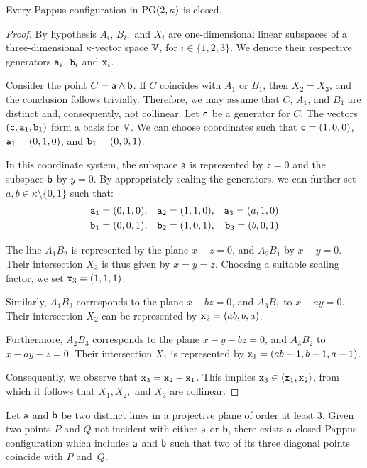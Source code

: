 \begin{thm}\label{thm:pappus} {\upshape[Pappus]}
    Every Pappus configuration in\/ $\operatorname{PG}(2,\kappa)$ is closed.
\end{thm}

\begin{proof}
    By hypothesis $A_i$, $B_i,$ and $X_i$ are one-dimensional linear subspaces of a three-dimensional $\kappa$-vector space $\mathbb V$, for $i \in \{1, 2, 3\}$. We denote their respective generators $\mathtt a_i$, $\mathtt b_i$ and $\mathtt x_i$.

    Consider the point $C = \mathsf a \wedge \mathsf b$. If $C$ coincides with $A_1$ or $B_1$, then $X_2=X_3$, and the conclusion follows trivially. Therefore, we may assume that $C$, $A_1$, and $B_1$ are distinct\/ and, consequently, not collinear. Let $\mathtt c$ be a generator for $C$. The vectors $(\mathtt c, \mathtt a_1, \mathtt b_1)$ form a basis for $\mathbb V$. We can choose coordinates such that $\mathtt c=(1,0,0)$, $\mathtt a_1=(0,1,0)$, and $\mathtt b_1=(0,0,1)$.

    In this coordinate system, the subspace $\mathsf a$ is represented by $z=0$ and the subspace $\mathsf b$ by $y=0$. By appropriately scaling the generators, we can further set $a,b \in \kappa \setminus \{0,1\}$ such that:
    \begin{align*}
        \mathtt a_1&=(0,1,0),&\mathtt a_2&=(1,1,0),&\mathtt a_3=(a,1,0)\\
        \mathtt b_1&=(0,0,1),&\mathtt b_2&=(1,0,1),&\mathtt b_3=(b,0,1)
    \end{align*}

    The line $A_1B_2$ is represented by the plane $x-z=0$, and $A_2B_1$ by $x-y=0$. Their intersection $X_3$ is thus given by $x=y=z$. Choosing a suitable scaling factor, we set $\mathtt x_3=(1,1,1)$.

    Similarly, $A_1B_3$ corresponds to the plane $x-bz=0$, and $A_3B_1$ to $x-ay=0$. Their intersection $X_2$ can be represented by $\mathtt x_2=(ab,b,a)$.

Furthermore, $A_2B_3$ corresponds to the plane $x-y-bz=0$, and $A_3B_2$ to $x-ay-z=0$. Their intersection $X_1$ is represented by $\mathtt x_1=(ab-1,b-1,a-1)$.

Consequently, we observe that $\mathtt x_3 = \mathtt x_2 - \mathtt x_1$. This implies $\mathtt x_3 \in \langle\mathtt x_1, \mathtt x_2\rangle$, from which it follows that $X_1, X_2,$ and $X_3$ are collinear.
    
\end{proof}

\begin{thm}
    Let\/ $\mathsf a$ and\/ $\mathsf b$ be two distinct\/ lines in a projective plane of order at least\/ $3$. Given two points\/ $P$ and\/ $Q$ not incident with either\/ $\mathsf a$ or\/ $\mathsf b$, there exists a closed Pappus configuration which includes\/ $\mathsf a$ and\/ $\mathsf b$ such that two of its three diagonal points coincide with\/ $P$ and\/~$Q$.
\end{thm}

